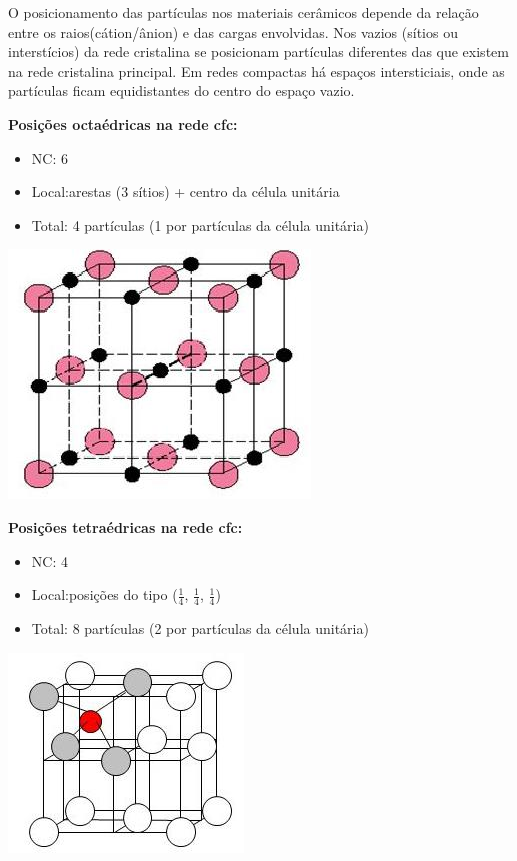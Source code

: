O posicionamento das partículas nos materiais cerâmicos depende da relação entre os raios(cátion/ânion) e das cargas envolvidas. Nos vazios (sítios ou interstícios) da rede cristalina se posicionam partículas diferentes das que existem na rede cristalina principal. Em redes compactas há espaços intersticiais, onde as partículas ficam equidistantes do centro do espaço vazio.
 

\textbf{Posições octaédricas na rede cfc:}

 \begin{itemize}
 	
 	\setlength{\parskip}{0pt}
 	\setlength{\itemsep}{0pt plus 1pt}
 	
 	\item NC: 6
 	\item Local:arestas (3 sítios) + centro da célula unitária
 	\item Total: 4 partículas (1 por partículas da célula unitária)
 \end{itemize}

 \includegraphics[scale=0.5,trim={0 0 0 0}]{figures/occfc}
 
 
\textbf{ Posições tetraédricas na rede cfc:}

  \begin{itemize}
 	
 	\setlength{\parskip}{0pt}
 	\setlength{\itemsep}{0pt plus 1pt}
 	
 	\item NC: 4
 	\item Local:posições do tipo ($\frac{1}{4}$, $\frac{1}{4}$, $\frac{1}{4}$)
 	\item Total: 8 partículas (2 por partículas	da célula unitária)
 \end{itemize}

 \includegraphics[scale=0.5,trim={0 0 0 0}]{figures/tetcfc}
 
